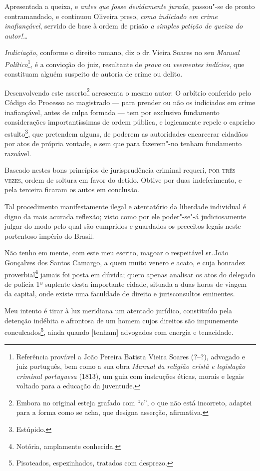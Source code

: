 Apresentada a queixa, e \emph{antes que fosse devidamente jurada},
passou"-se de pronto contramandado, e continuou Oliveira preso,
\emph{como indiciado em crime inafiançável}, servido de base à ordem de
prisão \emph{a simples petição de queixa do autor!\ldots{} }

\emph{Indiciação}, conforme o direito romano, diz o dr.\,Vieira Soares no
seu \emph{Manual Político}\footnote{Referência provável a João Pereira
  Batista Vieira Soares (?--?), advogado e juiz português, bem como a sua
  obra \emph{Manual da religião cristã e legislação criminal portuguesa}
  (1813), um guia com instruções éticas, morais e legais voltado para a
  educação da juventude.}, é a convicção do juiz, resultante de
\emph{prova} ou \emph{veementes} \emph{indícios}, que constituam alguém
suspeito de autoria de crime ou delito.

Desenvolvendo este asserto\footnote{Embora no original esteja grafado com ``c'',
  o que não está incorreto, adaptei para a forma como se
  acha, que designa asserção, afirmativa.} acrescenta o mesmo autor: O
arbítrio conferido pelo Código do Processo ao magistrado --- para
prender ou não os indiciados em crime inafiançável, antes de culpa
formada --- tem por exclusivo fundamento considerações importantíssimas
de ordem pública, e logicamente repele o capricho estulto\footnote{Estúpido.}, que pretendem alguns, de poderem as autoridades encarcerar
cidadãos por atos de própria vontade, e sem que para fazerem"-no tenham
fundamento razoável.

Baseado nestes bons princípios de jurisprudência criminal requeri, \textsc{por
três vezes}, ordem de soltura em favor do detido. Obtive por duas
indeferimento, e pela terceira ficaram os autos em conclusão.

Tal procedimento manifestamente ilegal e atentatório da liberdade
individual é digno da mais acurada reflexão; visto como por ele
poder"-se"-á judiciosamente julgar do modo pelo qual são cumpridos e
guardados os preceitos legais neste portentoso império do Brasil.

Não tenho em mente, com este meu escrito, magoar o respeitável sr.\,João
Gonçalves dos Santos Camargo, a quem muito venero e acato, e cuja
honradez proverbial\footnote{Notória, amplamente conhecida.} jamais
foi posta em dúvida; quero apenas analisar os atos do delegado de
polícia 1º suplente desta importante cidade, situada a duas horas de
viagem da capital, onde existe uma faculdade de direito e jurisconsultos
eminentes.

Meu intento é tirar à luz meridiana um atentado jurídico, constituído
pela detenção indébita e afrontosa de um homem cujos direitos são
impunemente conculcados\footnote{Pisoteados, espezinhados, tratados
  com desprezo.}, ainda quando {[}tenham{]} advogados com energia e
tenacidade.

